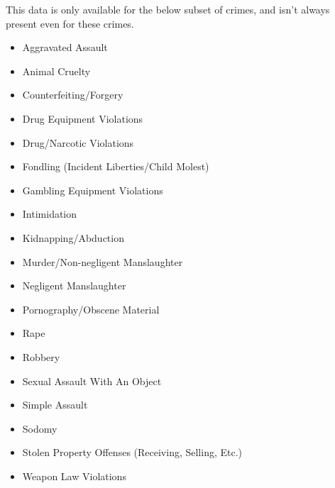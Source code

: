 \documentclass[
  12pt,
  openany]{book}
\providecommand{\tightlist}{%
  \setlength{\itemsep}{0pt}\setlength{\parskip}{0pt}}
\begin{document}
This data is only available for the below subset of crimes, and isn't always present even for these crimes.

\begin{itemize}
\tightlist
\item
  Aggravated Assault
\item
  Animal Cruelty
\item
  Counterfeiting/Forgery
\item
  Drug Equipment Violations
\item
  Drug/Narcotic Violations
\item
  Fondling (Incident Liberties/Child Molest)
\item
  Gambling Equipment Violations
\item
  Intimidation
\item
  Kidnapping/Abduction
\item
  Murder/Non-negligent Manslaughter
\item
  Negligent Manslaughter
\item
  Pornography/Obscene Material
\item
  Rape
\item
  Robbery
\item
  Sexual Assault With An Object
\item
  Simple Assault
\item
  Sodomy
\item
  Stolen Property Offenses (Receiving, Selling, Etc.)
\item
  Weapon Law Violations
\end{itemize}
\end{document}
